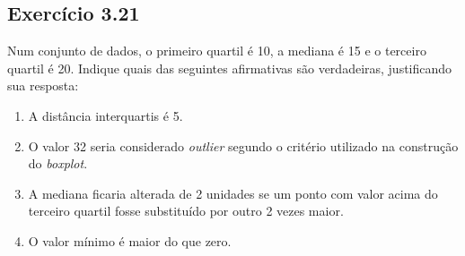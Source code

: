 \documentclass[
]{latex/krantz}
\providecommand{\tightlist}{%
  \setlength{\itemsep}{0pt}\setlength{\parskip}{0pt}}
\theoremstyle{definition}
\theoremstyle{definition}
\theoremstyle{definition}
\theoremstyle{definition}
\theoremstyle{remark}
\begin{document}
\hypertarget{exr3-21}{%
\subsection*{Exercício 3.21}\label{exr3-21}}

Num conjunto de dados, o primeiro quartil é 10, a mediana é 15 e o terceiro quartil é 20. Indique quais das seguintes afirmativas são verdadeiras, justificando sua resposta:

\begin{enumerate}
\def\labelenumi{\alph{enumi})}
\tightlist
\item
  A distância interquartis é 5.
\item
  O valor 32 seria considerado \emph{outlier} segundo o critério utilizado na construção do \emph{boxplot}.
\item
  A mediana ficaria alterada de 2 unidades se um ponto com valor acima do terceiro quartil fosse substituído por outro 2 vezes maior.
\item
  O valor mínimo é maior do que zero.
\end{enumerate}
\end{document}
